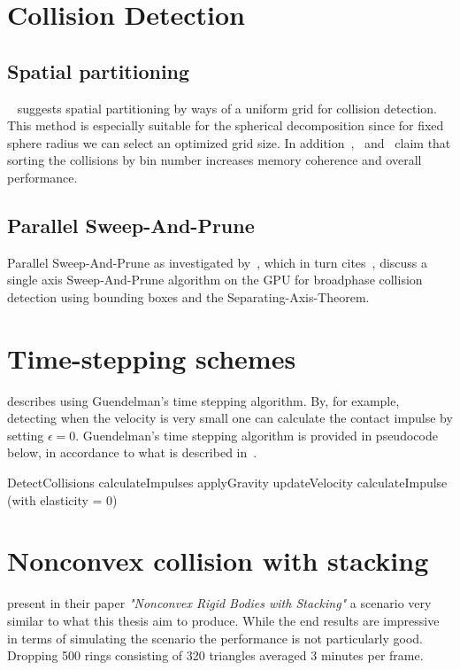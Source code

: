 \section{Collision Detection}\label{sec:gridCD}
\subsection{Spatial partitioning}
~\cite{gpugems} suggests spatial partitioning
by ways of a uniform grid for collision detection. This method is especially suitable
for the spherical decomposition since for fixed sphere radius we can select an optimized
grid size. In addition~\cite{gpugems},~\cite{green} and~\cite{fastnearest} claim that sorting
the collisions by bin number increases memory coherence and overall performance.
\subsection{Parallel Sweep-And-Prune}
Parallel Sweep-And-Prune as investigated by~\cite{gpupipedev}, which in turn cites~\cite{liu2010}, %
discuss a single axis Sweep-And-Prune algorithm on the GPU for broadphase collision
detection using bounding boxes and the Separating-Axis-Theorem.

\section{Time-stepping schemes}
\cite{Lembcke} describes using Guendelman's time stepping
algorithm. By, for example, detecting when the velocity is very small one can
calculate the contact impulse by setting $\epsilon = 0$.
Guendelman's time stepping algorithm is provided in pseudocode below, in accordance
to what is described in~\cite{guendelman}.

\begin{algorithm}[H]
  \begin{algorithmic}[1]
  \State DetectCollisions
    \State calculateImpulses
  \EndFor
  \State applyGravity
  \State updateVelocity
      \State calculateImpulse (with elasticity = 0)
    \EndFor
\end{algorithmic}
\end{algorithm}

\section{Nonconvex collision with stacking}
\cite{guendelman} present in their paper \textit{"Nonconvex Rigid Bodies with Stacking"}
a scenario very similar to what this thesis aim to produce.
While the end results are impressive in terms of simulating the scenario the performance
is not particularly good. Dropping 500 rings consisting of 320 triangles averaged 3 minutes per frame.

